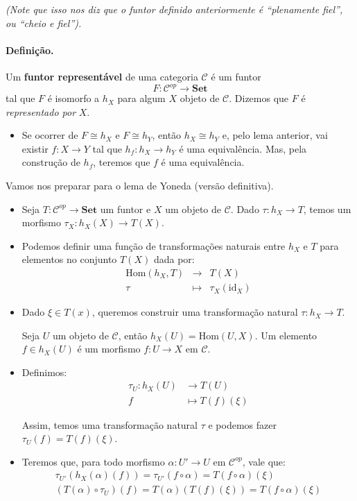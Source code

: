 \documentclass{article}
\theoremstyle{plain}                    %
\theoremstyle{definition}
\theoremstyle{remark}
\begin{document}
\medskip

\textit{(Note que isso nos diz que o funtor definido anteriormente é “plenamente fiel”, ou “cheio e fiel”).}

\paragraph{Definição.} Um \textbf{funtor representável} de uma categoria $\mathcal{C}$ é um funtor
\[
F : \mathcal{C}^{op} \to \mathbf{Set}
\]
tal que $F$ é isomorfo a $h_X$ para algum $X$ objeto de $\mathcal{C}$. Dizemos que $F$ é \textit{representado por} $X$.

\begin{itemize}
    \item Se ocorrer de $F \cong h_X$ e $F \cong h_Y$, então $h_X \cong h_Y$ e, pelo lema anterior, vai existir $f : X \to Y$ tal que $h_f : h_X \to h_Y$ é uma equivalência. Mas, pela construção de $h_f$, teremos que $f$ é uma equivalência.
\end{itemize}

\medskip

Vamos nos preparar para o lema de Yoneda (versão definitiva).

\begin{itemize}
    \item Seja $T : \mathcal{C}^{op} \to \mathbf{Set}$ um funtor e $X$ um objeto de $\mathcal{C}$. Dado $\tau : h_X \to T$, temos um morfismo $\tau_X : h_X(X) \to T(X)$.

    \item Podemos definir uma função de transformações naturais entre $h_X$ e $T$ para elementos no conjunto $T(X)$ dada por:
    \begin{eqnarray*}
        \text{Hom}(h_X, T) & \to & T(X) \\
        \tau & \mapsto & \tau_X(\text{id}_X)
    \end{eqnarray*}

    \item Dado $\xi \in T(x)$, queremos construir uma transformação natural $\tau : h_X \to T$.

    Seja $U$ um objeto de $\mathcal{C}$, então $h_X(U) = \text{Hom}(U, X)$. Um elemento $f \in h_X(U)$ é um morfismo $f : U \to X$ em $\mathcal{C}$.

    \item Definimos:
    \begin{align*}
    \tau_U : h_X(U) & \to T(U) \\ 
    f & \mapsto T(f)(\xi)
    \end{align*}

    Assim, temos uma transformação natural $\tau$ e podemos fazer $\tau_U(f) = T(f)(\xi)$.

    \item Teremos que, para todo morfismo $\alpha : U' \to U$ em $\mathcal{C}^{op}$, vale que:
    \begin{eqnarray}
        \tau_{U'}(h_X(\alpha)(f)) = \tau_{U'}(f \circ \alpha) = T(f \circ \alpha)(\xi) \\
        (T(\alpha) \circ \tau_U)(f) = T(\alpha)(T(f)(\xi)) = T(f \circ \alpha)(\xi)
    \end{eqnarray}
\end{itemize}
\end{document}
